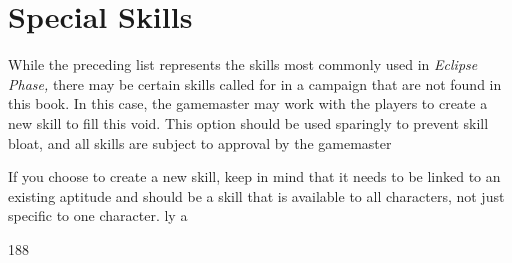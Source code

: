 \section{Special Skills}


While the preceding list represents the skills most commonly 
used in \textit{Eclipse Phase,} there may be certain skills called for in a 
campaign that are not found in this book. In this case, the gamemaster
may work with the players to create a new skill to fill
this void. This option should be used sparingly to prevent skill 
bloat, and all skills are subject to approval by the gamemaster

If you choose to create a new skill, keep in mind that it needs 
to be linked to an existing aptitude and should be a skill that 
is available to all characters, not just specific to one character.
ly 
a 

188
 
